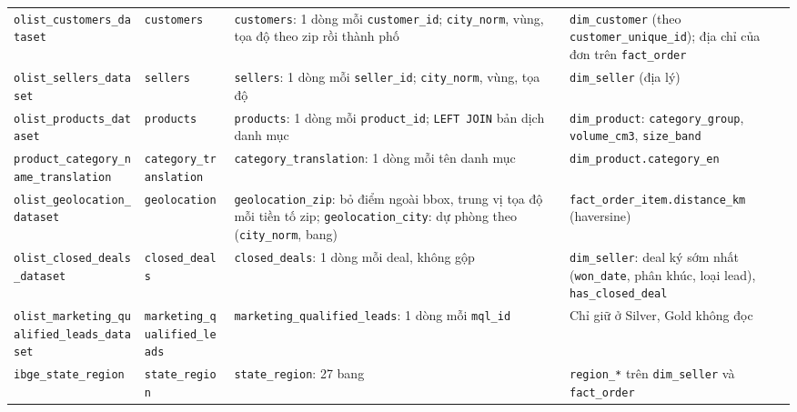 \documentclass[a4paper]{article}
\begin{document}
{\begin{longtable}{@{}>{\raggedright\arraybackslash}p{2.9cm}>{\raggedright\arraybackslash}p{2.5cm}>{\raggedright\arraybackslash}p{5.2cm}>{\raggedright\arraybackslash}p{5.2cm}@{}}
\addlinespace
\texttt{olist\_\allowbreak{}customers\_\allowbreak{}dataset} & \texttt{customers} & \texttt{customers}: 1 dòng mỗi \texttt{customer\_\allowbreak{}id}; \texttt{city\_\allowbreak{}norm}, vùng, tọa độ theo zip rồi thành phố & \texttt{dim\_\allowbreak{}customer} (theo \texttt{customer\_\allowbreak{}unique\_\allowbreak{}id}); địa chỉ của đơn trên \texttt{fact\_\allowbreak{}order} \\
\addlinespace
\texttt{olist\_\allowbreak{}sellers\_\allowbreak{}dataset} & \texttt{sellers} & \texttt{sellers}: 1 dòng mỗi \texttt{seller\_\allowbreak{}id}; \texttt{city\_\allowbreak{}norm}, vùng, tọa độ & \texttt{dim\_\allowbreak{}seller} (địa lý) \\
\addlinespace
\texttt{olist\_\allowbreak{}products\_\allowbreak{}dataset} & \texttt{products} & \texttt{products}: 1 dòng mỗi \texttt{product\_\allowbreak{}id}; \texttt{LEFT JOIN} bản dịch danh mục & \texttt{dim\_\allowbreak{}product}: \texttt{category\_\allowbreak{}group}, \texttt{volume\_\allowbreak{}cm3}, \texttt{size\_\allowbreak{}band} \\
\addlinespace
\texttt{product\_\allowbreak{}category\_\allowbreak{}name\_\allowbreak{}translation} & \texttt{category\_\allowbreak{}translation} & \texttt{category\_\allowbreak{}translation}: 1 dòng mỗi tên danh mục & \texttt{dim\_\allowbreak{}product.category\_\allowbreak{}en} \\
\addlinespace
\texttt{olist\_\allowbreak{}geolocation\_\allowbreak{}dataset} & \texttt{geolocation} & \texttt{geolocation\_\allowbreak{}zip}: bỏ điểm ngoài bbox, trung vị tọa độ mỗi tiền tố zip; \texttt{geolocation\_\allowbreak{}city}: dự phòng theo (\texttt{city\_\allowbreak{}norm}, bang) & \texttt{fact\_\allowbreak{}order\_\allowbreak{}item.distance\_\allowbreak{}km} (haversine) \\
\addlinespace
\texttt{olist\_\allowbreak{}closed\_\allowbreak{}deals\_\allowbreak{}dataset} & \texttt{closed\_\allowbreak{}deals} & \texttt{closed\_\allowbreak{}deals}: 1 dòng mỗi deal, không gộp & \texttt{dim\_\allowbreak{}seller}: deal ký sớm nhất (\texttt{won\_\allowbreak{}date}, phân khúc, loại lead), \texttt{has\_\allowbreak{}closed\_\allowbreak{}deal} \\
\addlinespace
\texttt{olist\_\allowbreak{}marketing\_\allowbreak{}qualified\_\allowbreak{}leads\_\allowbreak{}dataset} & \texttt{marketing\_\allowbreak{}qualified\_\allowbreak{}leads} & \texttt{marketing\_\allowbreak{}qualified\_\allowbreak{}leads}: 1 dòng mỗi \texttt{mql\_\allowbreak{}id} & Chỉ giữ ở Silver, Gold không đọc \\
\addlinespace
\texttt{ibge\_\allowbreak{}state\_\allowbreak{}region} & \texttt{state\_\allowbreak{}region} & \texttt{state\_\allowbreak{}region}: 27 bang & \texttt{region\_\allowbreak{}*} trên \texttt{dim\_\allowbreak{}seller} và \texttt{fact\_\allowbreak{}order} \\
\end{longtable}
}
\end{document}
